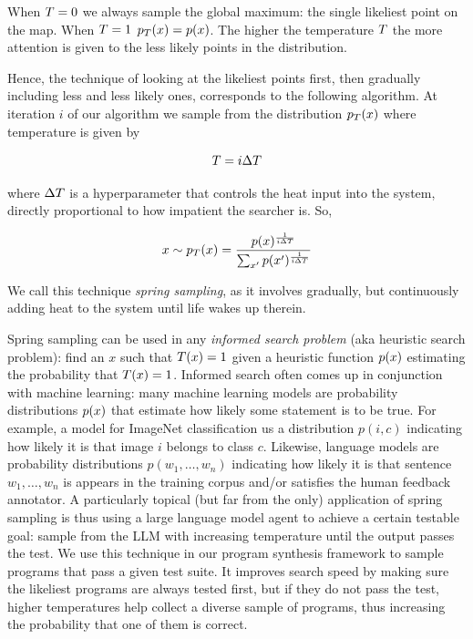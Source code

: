 When $T=0$ we always sample the global maximum: the single likeliest point on the map. 
When $T=1$ $p_T(x)=p(x)$.
The higher the temperature $T$ the more attention is given to the less likely points in the distribution.

Hence, the technique of looking at the likeliest points first, then gradually including less and less likely ones, corresponds to the following algorithm. At iteration $i$ of our algorithm we sample from the distribution $p_T(x)$ where temperature is given by

\begin{equation}
T = i \Delta T
\end{equation}

where $\Delta T$ is a hyperparameter that controls the heat input into the system, directly proportional to how impatient the searcher is. So,

\begin{equation}
x \sim p_T(x) = \frac{p(x)^{\frac{1}{i \Delta T}}}{\sum_{x'} p(x')^{\frac{1}{i \Delta T}}}
\end{equation}

We call this technique \emph{spring sampling}, as it involves gradually, but continuously adding heat to the system until life wakes up therein.

Spring sampling can be used in any \emph{informed search problem} (aka heuristic search problem): find an $x$ such that $T(x)=1$ given a heuristic function $p(x)$ estimating the probability that $T(x)=1$. 
Informed search often comes up in conjunction with machine learning: many machine learning models are probability distributions $p(x)$ that estimate how likely some statement is to be true.
For example, a model for ImageNet classification \cite{dengImagenetLargescaleHierarchical2009} us a distribution $p(i,c)$ indicating how likely it is that image $i$ belongs to class $c$.
Likewise, language models are probability distributions $p(w_1,\dots,w_n)$ indicating how likely it is that sentence $w_1,\dots,w_n$ is appears in the training corpus and/or satisfies the human feedback annotator.
A particularly topical (but far from the only) application of spring sampling is thus using a large language model agent to achieve a certain testable goal: sample from the LLM with increasing temperature until the output passes the test.
We use this technique in our program synthesis framework to sample programs that pass a given test suite.
It improves search speed by making sure the likeliest programs are always tested first, but if they do not pass the test, higher temperatures help collect a diverse sample of programs, thus increasing the probability that one of them is correct.


